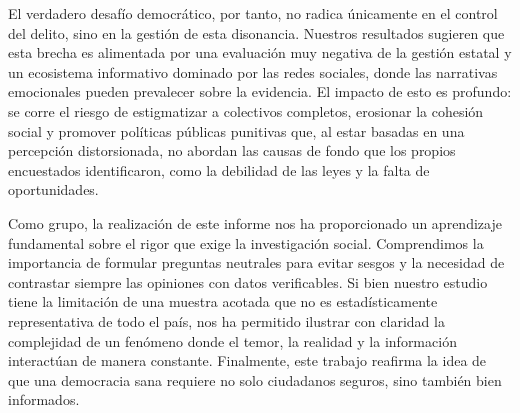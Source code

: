 \documentclass[12pt, a4paper]{article}
\begin{document}
El verdadero desafío democrático, por tanto, no radica únicamente en el control del delito, sino en la gestión de esta disonancia. Nuestros resultados sugieren que esta brecha es alimentada por una evaluación muy negativa de la gestión estatal y un ecosistema informativo dominado por las redes sociales, donde las narrativas emocionales pueden prevalecer sobre la evidencia. El impacto de esto es profundo: se corre el riesgo de estigmatizar a colectivos completos, erosionar la cohesión social y promover políticas públicas punitivas que, al estar basadas en una percepción distorsionada, no abordan las causas de fondo que los propios encuestados identificaron, como la debilidad de las leyes y la falta de oportunidades.

Como grupo, la realización de este informe nos ha proporcionado un aprendizaje fundamental sobre el rigor que exige la investigación social. Comprendimos la importancia de formular preguntas neutrales para evitar sesgos y la necesidad de contrastar siempre las opiniones con datos verificables. Si bien nuestro estudio tiene la limitación de una muestra acotada que no es estadísticamente representativa de todo el país, nos ha permitido ilustrar con claridad la complejidad de un fenómeno donde el temor, la realidad y la información interactúan de manera constante. Finalmente, este trabajo reafirma la idea de que una democracia sana requiere no solo ciudadanos seguros, sino también bien informados.

\newpage
\printbibliography
\end{document}
